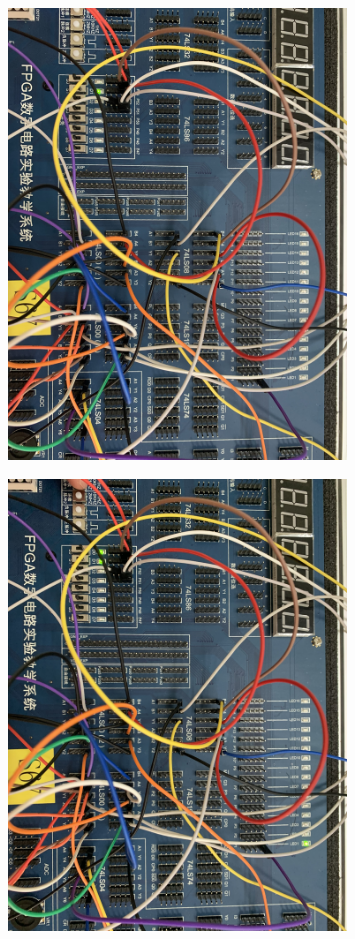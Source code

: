 \documentclass[UTF8, a4paper, 11pt]{article}
\begin{document}
\begin{figure}[H]
    \centering
    \includegraphics[width=0.8\textwidth]{0010.JPG}
\end{figure}
\begin{figure}[H]
    \centering
    \includegraphics[width=0.8\textwidth]{0011.JPG}
\end{figure}
\end{document}
